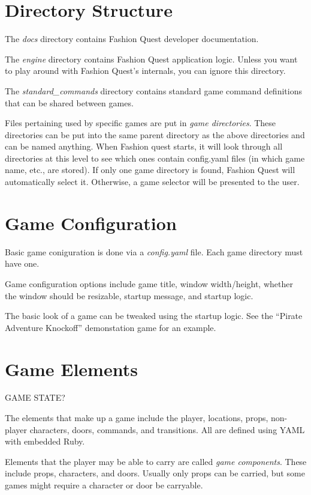 \documentclass[letterpaper,10pt,english]{manual}
\begin{document}
\section{Directory Structure}

The \emph{docs} directory contains Fashion Quest developer documentation.

The \emph{engine} directory contains Fashion Quest application logic. Unless you want to play around with Fashion Quest's internals, you can ignore this directory.

The \emph{standard\_commands} directory contains standard game command definitions that can be shared between games.

Files pertaining used by specific games are put in \emph{game directories}. These directories can be put into the same parent directory as the above directories and can be named anything. When Fashion quest starts, it will look through all directories at this level to see which ones contain config.yaml files (in which game name, etc., are stored). If only one game directory is found, Fashion Quest will automatically select it. Otherwise, a game selector will be presented to the user.


\section{Game Configuration}

Basic game coniguration is done via a \emph{config.yaml} file. Each game directory must have one.

Game configuration options include game title, window width/height, whether the window should be resizable, startup message, and startup logic.

The basic look of a game can be tweaked using the startup logic. See the ``Pirate Adventure Knockoff'' demonstation game for an example.


\section{Game Elements}

GAME STATE?

The elements that make up a game include the player, locations, props, non-player characters, doors, commands, and transitions. All are defined using YAML with embedded Ruby.

Elements that the player may be able to carry are called \emph{game components}. These include props, characters, and doors. Usually only props can be carried, but some games might require a character or door be carryable.
\end{document}
